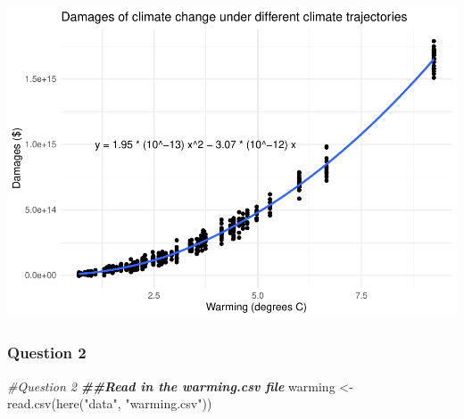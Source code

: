 \documentclass[
]{article}
\newenvironment{Shaded}{\begin{snugshade}}{\end{snugshade}}
\newcommand{\CommentTok}[1]{\textcolor[rgb]{0.56,0.35,0.01}{\textit{#1}}}
\newcommand{\DocumentationTok}[1]{\textcolor[rgb]{0.56,0.35,0.01}{\textbf{\textit{#1}}}}
\newcommand{\FunctionTok}[1]{\textcolor[rgb]{0.00,0.00,0.00}{#1}}
\newcommand{\NormalTok}[1]{#1}
\newcommand{\OtherTok}[1]{\textcolor[rgb]{0.56,0.35,0.01}{#1}}
\newcommand{\StringTok}[1]{\textcolor[rgb]{0.31,0.60,0.02}{#1}}
\begin{document}
\includegraphics{Homework-4-Code_files/figure-latex/unnamed-chunk-1-1.pdf}

\hypertarget{question-2}{%
\subsubsection{Question 2}\label{question-2}}

\begin{Shaded}
\begin{Highlighting}[]
\CommentTok{\#Question 2}
\DocumentationTok{\#\#Read in the warming.csv file}
\NormalTok{warming }\OtherTok{\textless{}{-}} \FunctionTok{read.csv}\NormalTok{(}\FunctionTok{here}\NormalTok{(}\StringTok{"data"}\NormalTok{, }\StringTok{"warming.csv"}\NormalTok{))}
\end{Highlighting}
\end{Shaded}
\end{document}
